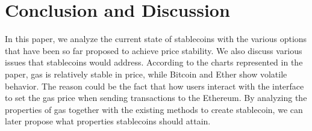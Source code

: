 
\section{Conclusion and Discussion}
In this paper, we analyze the current state of stablecoins with the various options that have been so far proposed to achieve price stability. We also discuss various issues that stablecoins would address. According to the charts represented in the paper, gas is relatively stable in price, while Bitcoin and Ether show volatile behavior. The reason could be the fact that how users interact with the interface to set the gas price when sending transactions to the Ethereum. By analyzing the properties of gas together with the existing methods to create stablecoin, we can later propose what properties stablecoins should attain.




